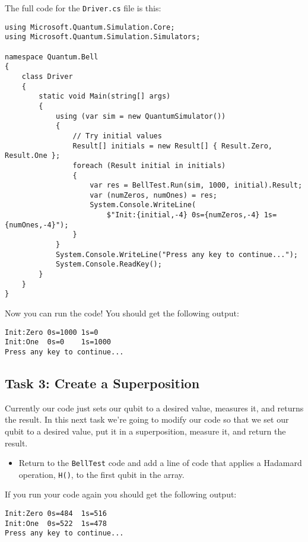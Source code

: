 \documentclass[a4paper]{article}
\begin{document}
The full code for the \verb$Driver.cs$ file is this:
\begin{lstlisting}
using Microsoft.Quantum.Simulation.Core;
using Microsoft.Quantum.Simulation.Simulators;

namespace Quantum.Bell
{
    class Driver
    {
        static void Main(string[] args)
        {
            using (var sim = new QuantumSimulator())
            {
                // Try initial values
                Result[] initials = new Result[] { Result.Zero, Result.One };
                foreach (Result initial in initials)
                {
                    var res = BellTest.Run(sim, 1000, initial).Result;
                    var (numZeros, numOnes) = res;
                    System.Console.WriteLine(
                        $"Init:{initial,-4} 0s={numZeros,-4} 1s={numOnes,-4}");
                }
            }
            System.Console.WriteLine("Press any key to continue...");
            System.Console.ReadKey();
        }
    }
}
\end{lstlisting}

Now you can run the code! You should get the following output:

\begin{lstlisting}
Init:Zero 0s=1000 1s=0
Init:One  0s=0    1s=1000
Press any key to continue...
\end{lstlisting}

\subsection{Task 3: Create a Superposition}
Currently our code just sets our qubit to a desired value, measures it, and returns the result. In this next task we're going to modify our code so that we set our qubit to a desired value, put it in a superposition, measure it, and return the result. 

\begin{itemize}
\item Return to the \verb$BellTest$ code and add a line of code that applies a Hadamard operation, \verb$H()$, to the first qubit in the array. 
\end{itemize}

If you run your code again you should get the following output:

\begin{lstlisting}
Init:Zero 0s=484  1s=516
Init:One  0s=522  1s=478
Press any key to continue...
\end{lstlisting}
\end{document}
